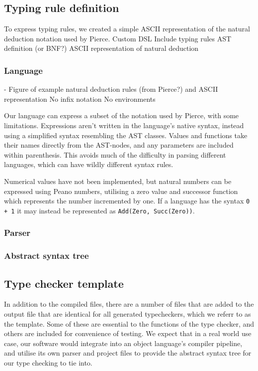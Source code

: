 \documentclass[nofilelist]{cslthse-msc}
\begin{document}
\subsection{Typing rule definition}\label{typingruledefinition}
To express typing rules, we created a simple ASCII representation of the natural deduction notation used by Pierce\cite{Pierce}.
Custom DSL
Include typing rules AST definition (or BNF?)
ASCII representation of natural deduction %
\subsubsection{Language}
- Figure of example natural deduction rules (from Pierce?) and ASCII representation
No infix notation
No environments

Our language can express a subset of the notation used by Pierce, with some limitations.
Expressions aren't written in the language's native syntax, instead using a simplified syntax resembling the AST classes.
Values and functions take their names directly from the AST-nodes, and any parameters are included within parenthesis.
This avoids much of the difficulty in parsing different languages, which can have wildly different syntax rules.

Numerical values have not been implemented, but natural numbers can be expressed using Peano numbers\cite{peano}, utilising a zero value and successor function which represents the number incremented by one.
If a language has the syntax \verb|0 + 1| it may instead be represented as \verb|Add(Zero, Succ(Zero))|.


\subsubsection{Parser}
\subsubsection{Abstract syntax tree}

\subsection{Type checker template}
In addition to the compiled files, there are a number of files that are added to the output file that are identical for all generated typecheckers, which we referr to as the template.
Some of these are essential to the functions of the type checker, and others are included for convenience of testing.
We expect that in a real world use case, our software would integrate into an object language's compiler pipeline, and utilise its own parser and project files to provide the abstract syntax tree for our type checking to tie into.
\end{document}

